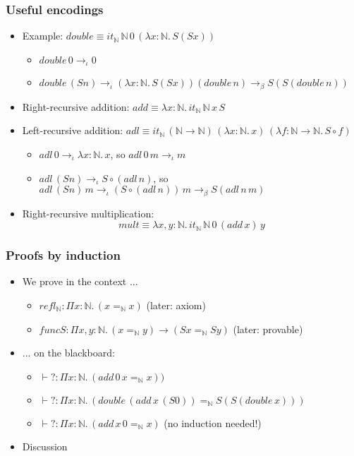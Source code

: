 \documentclass[handout]{beamer}
\newcommand{\depi}[3]{\Pi{#1{:}#2.\,#3}}
\newcommand{\lamt}[3]{\lambda{#1{:}#2.\,#3}}
\newcommand{\Nat}{\mathbb{N}}
\begin{document}
\frame
  {
  
    \frametitle{Useful encodings}

    \begin{itemize}[<+->]
    \item Example: $double \equiv it_\Nat\,\Nat\,0\,(\lamt{x}{\Nat}{S(Sx)})$
    \begin{itemize}[<+->]
      \item $double\,0 \to_\iota 0$
      \item $double\,(Sn) \to_\iota (\lamt{x}{\Nat}{S(Sx)})(double\,n) \to_\beta S(S(double\,n))$
      \end{itemize}
     \item Right-recursive addition: 
     $add \equiv \lamt{x}{\Nat}{it_\Nat\,\Nat\,x\,S}$
    \item Left-recursive addition: 
    $adl \equiv it_\Nat\,(\Nat{\to}\Nat)\,(\lamt{x}{\Nat}{x})\,(\lamt{f}{\Nat{\to}\Nat}{S\circ f})$
      \begin{itemize}[<+->]
      \item $adl\,0 \to_\iota \lamt{x}{\Nat}{x}$, so $adl\,0\,m \to_\iota m$
      \item $adl\,(Sn) \to_\iota S\circ (adl\,n)$, so\\
            $adl\,(Sn)\,m \to_\iota (S\circ (adl\,n))\,m \to_\beta S(adl\,n\,m)$
      \end{itemize}
     \item Right-recursive multiplication: 
     \[mult \equiv \lamt{x,y}{\Nat}{it_\Nat\,\Nat\,0\,(add\,x)\,y}\]
    \end{itemize}
  }

\frame
  {
   
    \frametitle{Proofs by induction}

    \begin{itemize}[<+->]
    \item We prove in the context ...
      \begin{itemize}[<+->]
      \item $refl_\Nat:\depi{x}{\Nat}{(x =_\Nat x)}$ (later: axiom)
      \item $funcS:\depi{x{,}y}{\Nat}{(x =_\Nat y) \to (Sx=_\Nat Sy)}$ (later: provable)
      \end{itemize}
    \item ... on the blackboard:
      \begin{itemize}[<+->]
    \item $\vdash ?:\depi{x}{\Nat}{(add\,0\,x =_\Nat x)})$
    \item $\vdash ?:\depi{x}{\Nat}{(double\,(add\,x\,(S0)) =_\Nat S(S(double\,x)))}$
    \item $\vdash ?:\depi{x}{\Nat}{(add\,x\,0 =_\Nat x)}$ (no induction needed!) 
      \end{itemize}
    \item Discussion
    \end{itemize}
  }
\end{document}
